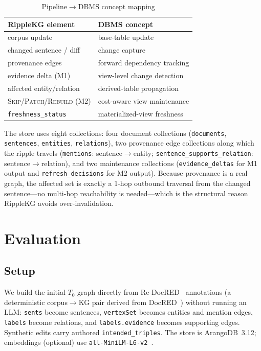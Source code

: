 \documentclass[conference]{IEEEtran}
\begin{document}
\begin{table}[t]
\caption{Pipeline$\rightarrow$DBMS concept mapping}
\label{tab:map}
\centering
\footnotesize
\begin{tabular}{p{}p{}}
\toprule
\textbf{RippleKG element} & \textbf{DBMS concept}\\
\midrule
corpus update & base-table update\\
changed sentence / diff & change capture\\
provenance edges & forward dependency tracking\\
evidence delta (M1) & view-level change detection\\
affected entity/relation & derived-table propagation\\
\textsc{Skip}/\textsc{Patch}/\textsc{Rebuild} (M2) & cost-aware view maintenance\\
\texttt{freshness\_status} & materialized-view freshness\\
\bottomrule
\end{tabular}
\end{table}

The store uses eight collections: four document collections
(\texttt{documents}, \texttt{sentences}, \texttt{entities}, \texttt{relations}),
two provenance edge collections along which the ripple travels
(\texttt{mentions}: sentence$\rightarrow$entity;
\texttt{sentence\_supports\_relation}: sentence$\rightarrow$relation), and two
maintenance collections (\texttt{evidence\_deltas} for M1 output and
\texttt{refresh\_decisions} for M2 output). Because provenance is a real graph,
the affected set is exactly a 1-hop outbound traversal from the changed
sentence---no multi-hop reachability is needed---which is the structural reason
RippleKG avoids over-invalidation.

\section{Evaluation}
\label{sec:eval}

\subsection{Setup}
We build the initial $T_0$ graph directly from Re-DocRED~\cite{redocred}
annotations (a deterministic corpus$\rightarrow$KG pair derived from
DocRED~\cite{docred}) without running an LLM: \texttt{sents} become sentences,
\texttt{vertexSet} becomes entities and mention edges, \texttt{labels} become
relations, and \texttt{labels.evidence} becomes supporting edges. Synthetic edits
carry authored \texttt{intended\_triples}. The store is ArangoDB~3.12; embeddings
(optional) use \texttt{all-MiniLM-L6-v2}~\cite{sbert}.
\end{document}
